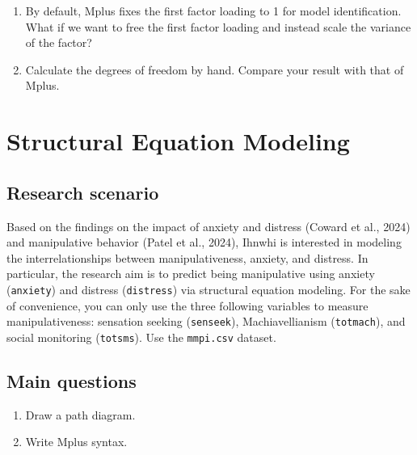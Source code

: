 \documentclass[
]{book}
\begin{document}
\begin{enumerate}
\def\labelenumi{\arabic{enumi}.}
\item
  By default, Mplus fixes the first factor loading to 1 for model identification. What if we want to free the first factor loading and instead scale the variance of the factor?
\item
  Calculate the degrees of freedom by hand. Compare your result with that of Mplus.
\end{enumerate}

\hypertarget{structural-equation-modeling}{%
\chapter{Structural Equation Modeling}\label{structural-equation-modeling}}

\hypertarget{research-scenario-2}{%
\section{Research scenario}\label{research-scenario-2}}

Based on the findings on the impact of anxiety and distress (Coward et al., 2024) and manipulative behavior (Patel et al., 2024), Ihnwhi is interested in modeling the interrelationships between manipulativeness, anxiety, and distress. In particular, the research aim is to predict being manipulative using anxiety (\texttt{anxiety}) and distress (\texttt{distress}) via structural equation modeling. For the sake of convenience, you can only use the three following variables to measure manipulativeness: sensation seeking (\texttt{senseek}), Machiavellianism (\texttt{totmach}), and social monitoring (\texttt{totsms}). Use the \texttt{mmpi.csv} dataset.

\hypertarget{main-questions-2}{%
\section{Main questions}\label{main-questions-2}}

\begin{enumerate}
\def\labelenumi{\arabic{enumi}.}
\item
  Draw a path diagram.
\item
  Write Mplus syntax.
\end{enumerate}
\end{document}
